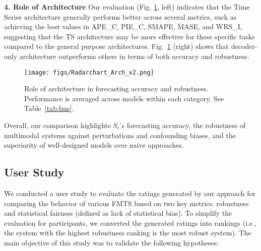 \noindent \textbf{4. Role of Architecture}
Our evaluation (Fig. \ref{fig:radar-arch}, left) indicates that the Time Series architecture generally performs better across several  metrics, such as achieving the best values in APE\_C, PIE\_C, SMAPE, MASE, and WRS\_I, suggesting that the TS architecture may be more effective for these specific tasks compared to the general purpose architectures. Fig.~\ref{fig:radar-arch} (right) shows that decoder-only architecture outperforms others in terms of both accuracy and robustness.
\begin{figure}[t]
    \centering
    \texttt{[image: figs/Radarchart\_Arch\_v2.png]}
    \caption{Role of architecture in forecasting accuracy and robustness. Performance is averaged across models within each category. See Table~\ref{tab:fms}.}
    \label{fig:radar-arch}
    \vspace{-1em}
\end{figure}
\noindent Overall, our comparison highlights $S_c$'s forecasting accuracy, the robustness of multimodal systems against perturbations and confounding biases, and the superiority of well-designed models over naive approaches.


\subsection{User Study}
\label{sec:userstudy}

We conducted a user study to evaluate the ratings generated by our approach for comparing the behavior of various FMTS based on two key metrics: robustness and statistical fairness (defined as lack of statistical bias). To simplify the evaluation for participants, we converted the generated ratings into rankings (i.e., the system with the highest robustness ranking is the most robust system). The main objective of this study was to validate the following hypotheses:

